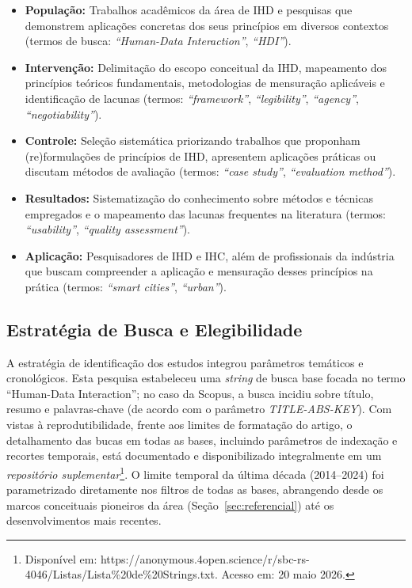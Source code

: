 \documentclass[12pt]{article}
\begin{document}
\begin{itemize}
\item \textbf{População:} Trabalhos acadêmicos da área de IHD e pesquisas que demonstrem aplicações concretas dos seus princípios em diversos contextos (termos de busca: \textit{``Human-Data Interaction''}, \textit{``HDI''}).
\item \textbf{Intervenção:} Delimitação do escopo conceitual da IHD, mapeamento dos princípios teóricos fundamentais, metodologias de mensuração aplicáveis e identificação de lacunas (termos: \textit{``framework''}, \textit{``legibility''}, \textit{``agency''}, \textit{``negotiability''}).
\item \textbf{Controle:} Seleção sistemática priorizando trabalhos que proponham (re)formulações de princípios de IHD, apresentem aplicações práticas ou discutam métodos de avaliação (termos: \textit{``case study''}, \textit{``evaluation method''}).
\item \textbf{Resultados:} Sistematização do conhecimento sobre métodos e técnicas empregados e o mapeamento das lacunas frequentes na literatura (termos: \textit{``usability''}, \textit{``quality assessment''}).
\item \textbf{Aplicação:} Pesquisadores de IHD e IHC, além de profissionais da indústria que buscam compreender a aplicação e mensuração desses princípios na prática (termos: \textit{``smart cities''}, \textit{``urban''}).
\end{itemize}

\subsection{Estratégia de Busca e Elegibilidade}
\label{estrategiaDeBusca}

    A estratégia de identificação dos estudos integrou parâmetros temáticos e cronológicos. Esta pesquisa estabeleceu uma \textit{string} de busca base focada no termo ``Human-Data Interaction''; no caso da Scopus, a busca incidiu sobre título, resumo e palavras-chave (de acordo com o parâmetro \textit{TITLE-ABS-KEY}). Com vistas à reprodutibilidade, frente aos limites de formatação do artigo, o detalhamento das bucas em todas as bases, incluindo parâmetros de indexação e recortes temporais, está documentado e disponibilizado integralmente em um \emph{repositório suplementar}\footnote{Disponível em: https://anonymous.4open.science/r/sbc-rs-4046/Listas/Lista\%20de\%20Strings.txt. Acesso em: 20 maio 2026.}. O limite temporal da última década (2014--2024) foi parametrizado diretamente nos filtros de todas as bases, abrangendo desde os marcos conceituais pioneiros da área (Seção~\ref{sec:referencial}) até os desenvolvimentos mais recentes.
\end{document}

